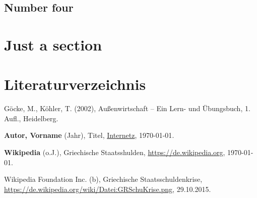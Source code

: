 \documentclass[fontsize=12pt,parskip=false,numbers=enddot]{scrartcl} %
\newcommand{\bib}[5]{\textbf{#1} \normalfont({#2}), {#3}, \url{#4}, {#5}.

}
\begin{document}
\subsection{Number four}
\lipsum[4-5]

\section{Just a section}
\lipsum[5-10]






\newpage
\pagestyle{empty}
\section*{Literaturverzeichnis}
Göcke, M., Köhler, T. (2002), Außenwirtschaft – Ein Lern- und Übungsbuch, 1. Aufl., Heidelberg.

\bib{Autor, Vorname}{Jahr}{Titel}{Internetz}{\today}
\bib{Wikipedia}{o.J.}{Griechische Staatsshulden}{https://de.wikipedia.org}{\today}
Wikipedia Foundation Inc. (b), Griechische Staatsschuldenkrise, \url{https://de.wikipedia.org/wiki/Datei:GRSchuKrise.png}, 29.10.2015.




\newpage

\newpage
\thispagestyle{empty}
\quad
\end{document}
